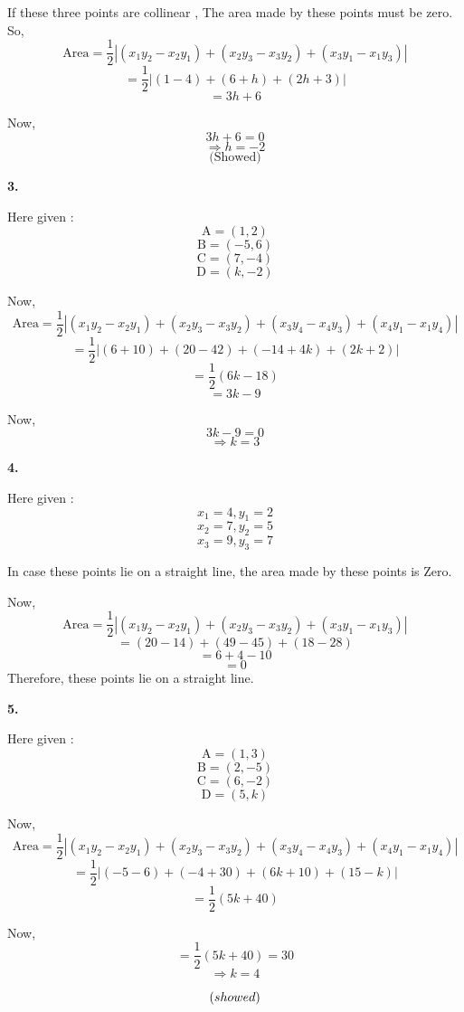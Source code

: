 \documentclass{article}
\begin{document}
\begin{flushleft}
If these three points are collinear , The area made by these points must be zero. So,
\[\text{Area} = \frac{1}{2} |(x_1y_2-x_2y_1)+(x_2y_3-x_3y_2)+(x_3y_1-x_1y_3)| \]
\[=\frac{1}{2} |(1-4)+(6+h)+(2h+3)|\]
\[=3h+6\]\par
Now,
\[3h+6=0\]
\[\Longrightarrow h=-2\]
\[\text{(Showed)}\]\par
\newpage

\textbf{3.}\par
\vspace{0.5cm}
Here given : 
\[\text{A}=(1,2)\]
\[\text{B}=(-5,6)\]
\[\text{C}=(7,-4)\]
\[\text{D}=(k,-2)\]\par
Now,
\[\text{Area} = \frac{1}{2} |(x_1y_2-x_2y_1)+(x_2y_3-x_3y_2)+(x_3y_4-x_4y_3)+(x_4y_1-x_1y_4)| \]
\[=\frac{1}{2}|(6+10)+(20-42)+(-14+4k)+(2k+2)|\]
\[=\frac{1}{2}(6k-18)\]
\[=3k-9\]\par
Now,
\[3k-9=0\]
\[\Longrightarrow k=3\]\par
\vspace{1cm}

\textbf{4.}\par
\vspace{0.5cm}
Here given : 
\[ x_1 = 4, y_1 = 2 \]
\[ x_2 = 7, y_2 = 5 \]
\[ x_3 = 9, y_3 = 7 \]\par

In case these points lie on a straight line, the area made by these points is Zero.\par
\vspace{0.5cm}
Now,
\[\text{Area} = \frac{1}{2} |(x_1y_2-x_2y_1)+(x_2y_3-x_3y_2)+(x_3y_1-x_1y_3)| \]
\[=(20-14)+(49-45)+(18-28)\]
\[=6+4-10\]
\[=0\]
\vspace{0.5cm}
Therefore, these points lie on a straight line.\par
\vspace{1cm}

\textbf{5.}\par
\vspace{0.5cm}
Here given : 
\[\text{A}=(1,3)\]
\[\text{B}=(2,-5)\]
\[\text{C}=(6,-2)\]
\[\text{D}=(5,k)\]\par
Now,
\[\text{Area} = \frac{1}{2} |(x_1y_2-x_2y_1)+(x_2y_3-x_3y_2)+(x_3y_4-x_4y_3)+(x_4y_1-x_1y_4)| \]
\[=\frac{1}{2}|(-5-6)+(-4+30)+(6k+10)+(15-k)|\]
\[=\frac{1}{2}(5k+40)\]\par
Now,
\[=\frac{1}{2}(5k+40)=30\]
\[\Longrightarrow k=4\]\par
\[\text(showed)\]\par
\vspace{1cm}


\end{flushleft}
\end{document}
